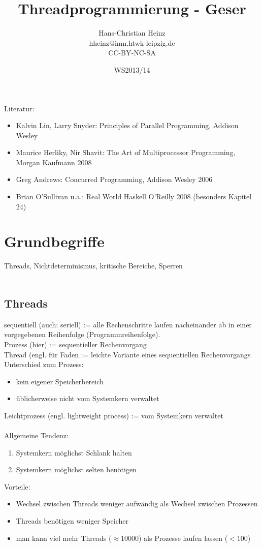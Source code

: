 \documentclass[a4paper,12pt]{scrartcl}
\title{Threadprogrammierung - Geser}
\author{Hans-Christian Heinz\\
hheinz@imn.htwk-leipzig.de\\
CC-BY-NC-SA}
\date{WS2013/14}
\begin{document}
\maketitle

Literatur:
\begin{itemize}
 \item Kalvin Lin, Larry Snyder: Principles of Parallel Programming, Addison Wesley
 \item Maurice Herliky, Nir Shavit: The Art of Multiprocessor Programming, Morgan Kaufmann 2008
 \item Greg Andrews: Concurred Programming, Addison Wesley 2006
 \item Brian O'Sullivan u.a.: Real World Haskell O'Reilly 2008 (besonders Kapitel 24)
\end{itemize}

\section{Grundbegriffe}
Threads, Nichtdeterminismus, kritische Bereiche, Sperren\\
\\
\subsection{Threads}
sequentiell (auch: seriell) := alle Rechenschritte laufen nacheinander ab in einer vorgegebenen Reihenfolge (\glqq{}Programmreihenfolge\grqq{}).\\
Prozess (hier) := sequentieller Rechenvorgang\\
Thread (engl. für \glqq{}Faden\grqq{} := leichte Variante eines sequentiellen Rechenvorgangs\\
Unterschied zum Prozess:
\begin{itemize}
 \item kein eigener Speicherbereich
 \item üblicherweise nicht vom Systemkern verwaltet
\end{itemize}
Leichtprozess (engl. lightweight process) := vom Systemkern verwaltet
\\
\\
Allgemeine Tendenz:
\begin{enumerate}
 \item Systemkern möglichst Schlank halten
 \item Systemkern möglichst selten benötigen
\end{enumerate}

Vorteile:
\begin{itemize}
 \item Wechsel zwischen Threads weniger aufwändig als Wechsel zwischen Prozessen
 \item Threads benötigen weniger Speicher 
 \item man kann viel mehr Threads ($\approx 10000$) als Prozesse laufen lassen ($< 100$)
\end{itemize}
\end{document}

